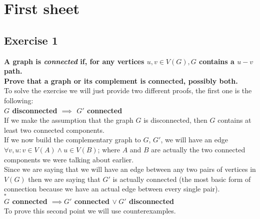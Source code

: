 \section*{First sheet}
\subsection*{Exercise 1} 
\boldmath \textbf{A graph is \textit{connected} if, for any vertices $u, v \in V(G), G$ contains a 
$u - v$ path.\\ 
Prove that a graph or its complement is connected, possibly both.} \vspace{10pt}\\ \unboldmath 
To solve the exercise we will just provide two different proofs, the first one is the following:
\vspace{5pt}\\ \boldmath 
\textbf{$G$ disconnected $\implies$ $G'$ connected}\vspace{5pt}\\ \unboldmath 
If we make the assumption that the graph $G$ is disconnected, then $G$ contains at least two 
connected components.\\ 
If we now build the complementary graph to $G$, $G'$, we will have an edge $\forall v, u : v \in 
V(A) \land u \in V(B)$; where $A$ and $B$ are actually the two connected components we were talking 
about earlier.\\
Since we are saying that we will have an edge between any two pairs of vertices in $V(G)$ then we
are saying that $G'$ is actually connected (the most basic form of connection because we have an
actual edge between every single pair). 
\vspace{2pt}\\\hspace*{3cm}$\square$\vspace*{10pt}\\
\boldmath \textbf{$G$ connected $\implies G'$ connected $\vee\hspace{3pt} G'$
disconnected}\vspace{5pt}\\ \unboldmath 
To prove this second point we will use counterexamples. \\
